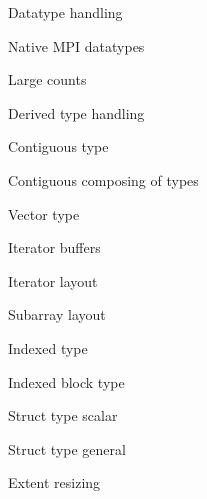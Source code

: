 \documentclass[10pt]{beamer}
\begin{document}
\begin{numberedframe}{Datatype handling}
  
\end{numberedframe}
\begin{numberedframe}{Native MPI datatypes}
  
\end{numberedframe}
\begin{numberedframe}{Large counts}
    
\end{numberedframe}
\begin{numberedframe}{Derived type handling}
  
\end{numberedframe}
\begin{numberedframe}{Contiguous type}
  
\end{numberedframe}
\begin{numberedframe}{Contiguous composing of types}
  
\end{numberedframe}
\begin{numberedframe}{Vector type}
  
\end{numberedframe}
\begin{numberedframe}{Iterator buffers}
  
\end{numberedframe}
\begin{numberedframe}{Iterator layout}
  
\end{numberedframe}
\begin{numberedframe}{Subarray layout}
  
\end{numberedframe}
\begin{numberedframe}{Indexed type}
  
\end{numberedframe}
\begin{numberedframe}{Indexed block type}
  
\end{numberedframe}
\begin{numberedframe}{Struct type scalar}
  
\end{numberedframe}
\begin{numberedframe}{Struct type general}
  
\end{numberedframe}
\begin{numberedframe}{Extent resizing}
    
\end{numberedframe}
\end{document}

